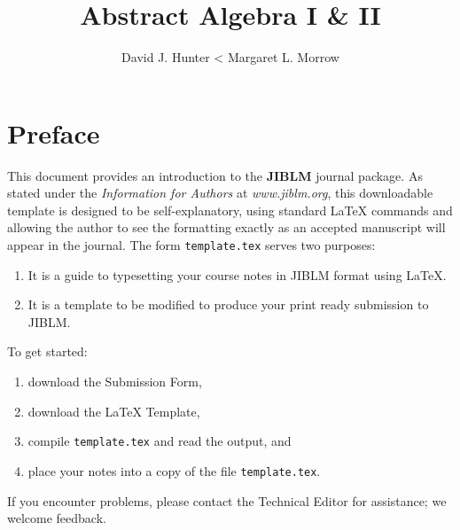 
%

%
\InstructorVersion
%


\large
\frontmatter
\title{Abstract Algebra I \& II}
\author{David J. Hunter < Margaret L. Morrow}
\maketitle
\tableofcontents

\chapter{Preface}

This document provides an introduction to the \textbf{JIBLM} journal package.
As stated under the \emph{Information for Authors} at \emph{www.jiblm.org},
this downloadable template is designed to be self-explanatory,
using standard LaTeX commands and allowing the author to see the formatting exactly as
an accepted manuscript will appear in the journal.  The form \texttt{template.tex} serves two purposes:
\begin{enumerate}
 \item It is a guide to typesetting your course notes in JIBLM format using \LaTeX.
 \item It is a template to be modified to produce your print ready submission to JIBLM.
\end{enumerate}

\noindent
To get started:
\begin{enumerate}
 \item download the Submission Form,
 \item download the LaTeX Template,
 \item compile \texttt{template.tex} and read the output, and
 \item place your notes into a copy of the file \texttt{template.tex}.
\end{enumerate}

\noindent
If you encounter problems, please contact the Technical Editor for assistance;
we welcome feedback.




